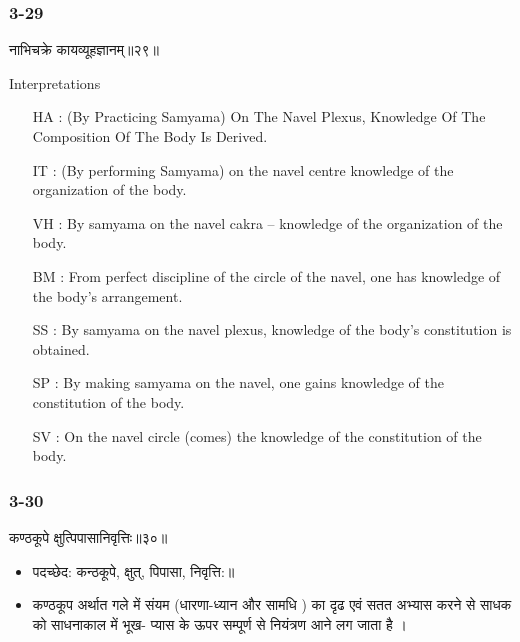 \begin{frame}[fragile]\frametitle{3-29}
\begin{sanskrit}
नाभिचक्रे कायव्यूहज्ञानम्॥२९॥
\end{sanskrit}

Interpretations
\begin{itemize}	
\item [HA]: (By Practicing Samyama) On The Navel Plexus, Knowledge Of The Composition Of The Body Is Derived.
\item [IT]: (By performing Samyama) on the navel centre knowledge of the organization of the body.
\item [VH]: By samyama on the navel cakra – knowledge of the organization of the body.
\item [BM]: From perfect discipline of the circle of the navel, one has knowledge of the body’s arrangement.
\item [SS]: By samyama on the navel plexus, knowledge of the body’s constitution is obtained.
\item [SP]: By making samyama on the navel, one gains knowledge of the constitution of the body.
\item [SV]: On the navel circle (comes) the knowledge of the constitution of the body. 
\end{itemize}
\end{frame}


\begin{frame}[fragile]\frametitle{3-30}
\begin{sanskrit}
कण्ठकूपे क्षुत्पिपासानिवृत्तिः॥३०॥
\end{sanskrit}

\begin{itemize}
\item पदच्छेद:  कन्ठकूपे, क्षुत्, पिपासा, निवृत्ति:‌॥
\item  कण्ठकूप अर्थात गले में  संयम (धारणा-ध्यान और सामधि ) का दृढ एवं सतत अभ्यास करने से साधक को साधनाकाल में भूख- प्यास के ऊपर सम्पूर्ण से नियंत्रण आने लग  जाता है ।
\end{itemize}
\end{frame}



